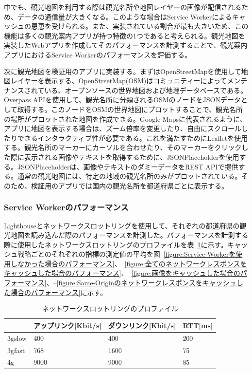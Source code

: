 中でも、観光地図を利用する際は観光名所や地図レイヤーの画像が配信されるため、データの通信量が大きくなる。このような場合はService Workerによるキャッシュの恩恵を受けられる。また、実装されている割合が最も大きいため、この機能は多くの観光案内アプリが持つ特徴の1つであると考えられる。観光地図を実装したWebアプリを作成してそのパフォーマンスを計測することで、観光案内アプリにおけるService Workerのパフォーマンスを評価する。

次に観光地図を検証用のアプリに実装する。まずはOpenStreetMapを使用して地図レイヤーを表示する、OpenStreetMap(OSM)はコミュニティーによってメンテナンスされている、オープンソースの世界地図および地理データベースである。Overpass APIを使用して、観光名所に分類されるOSMのノードをJSONデータとして取得する。このノードをOSMの世界地図にプロットすることで、観光名所の場所がプロットされた地図を作成できる。Google Mapsに代表されるように、アプリに地図を表示する場合は、ズーム倍率を変更したり、自由にスクロールしたりできるインタラクティブ性が必要である。これを満たすためにLeafletを使用する。観光名所のマーカーにカーソルを合わせたり、そのマーカーをクリックした際に表示される画像やテキストを取得するために、JSONPlaceholderを使用する。JSONPlaceholderは、画像やテキストのダミーデータをREST APIで提供する。通常の観光地図には、特定の地域の観光名所のみがプロットされている。そのため、検証用のアプリでは国内の観光名所を都道府県ごとに表示する。

\subsubsection{Service Workerのパフォーマンス}\label{subsubsection:Service Workerのパフォーマンス}
Lighthouseとネットワークスロットリングを使用して、それぞれの都道府県の観光地図を読み込んだ際のパフォーマンスを計測した。パフォーマンスを計測する際に使用したネットワークスロットリングのプロファイルを表~\ref{table:ネットワークスロットリングのプロファイル}に示す。キャッシュ戦略ごとのそれぞれの指標の測定値の平均を図~\ref{figure:Service Workerを使用しなかった場合のパフォーマンス}、~\ref{figure:全てのネットワークレスポンスをキャッシュした場合のパフォーマンス}、~\ref{figure:画像をキャッシュした場合のパフォーマンス}、–\ref{figure:Same-Originのネットワークレスポンスをキャッシュした場合のパフォーマンス}に示す。

\begin{table}
  \caption{ネットワークスロットリングのプロファイル}\label{table:ネットワークスロットリングのプロファイル}
  \centering
  \begin{tabular}{|p{5em}|p{10em}|p{10em}|p{10em}|}
    \hline
    & アップリンク[Kbit/s] & ダウンリンク[Kbit/s] & RTT[ms] \\ \hline
    3gslow & 400 & 400 & 200 \\ \hline
    3gfast & 768 & 1600 & 75 \\ \hline
    4g & 9000 & 9000 & 85 \\ \hline
  \end{tabular}
\end{table}

